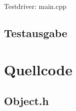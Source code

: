 Testdriver: main.cpp

\subsection{Testausgabe}
%






\section{Quellcode}

\subsection{Object.h}


